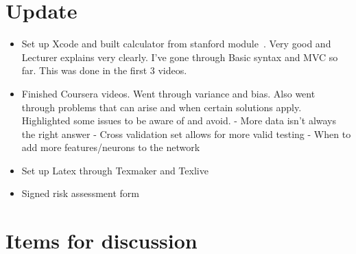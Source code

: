 \documentclass[]{weekly-report}
\begin{document}

\def\studentname{Philip Corr}
\def\projecttitle{ConvNets for iOS Gesture Recognition Applications}
\def\ucdstudentnumber{12318581}
\def\weeklyreportnumber{2}
\maketitle


\section{Update}

\begin{itemize}

\item Set up Xcode and built calculator from stanford module~\cite{PaulHegarty2016}. Very good and Lecturer explains very clearly. I've gone through Basic syntax and MVC so far. This was done in the first 3 videos.

\item Finished Coursera videos. Went through variance and bias. Also went through problems that can arise and when certain solutions apply.
Highlighted some issues to be aware of and avoid.
	- More data isn't always the right answer
	- Cross validation set allows for more valid testing
	- When to add more features/neurons to the network
	
\item Set up Latex through Texmaker and Texlive

\item Signed risk assessment form
	
\end{itemize}

\section{Items for discussion}
\end{document}
